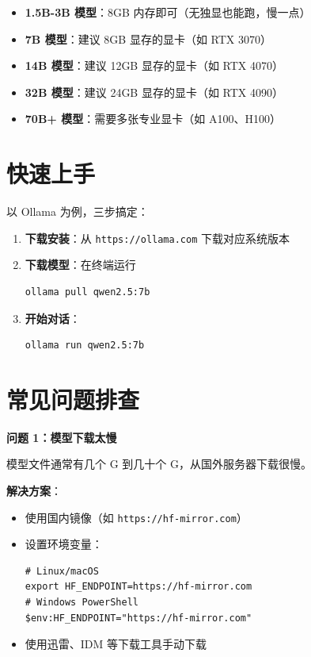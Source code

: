 \documentclass[12pt,UTF8]{ctexbook}
\begin{document}
\begin{itemize}
  \item \textbf{1.5B-3B 模型}：8GB 内存即可（无独显也能跑，慢一点）
  \item \textbf{7B 模型}：建议 8GB 显存的显卡（如 RTX 3070）
  \item \textbf{14B 模型}：建议 12GB 显存的显卡（如 RTX 4070）
  \item \textbf{32B 模型}：建议 24GB 显存的显卡（如 RTX 4090）
  \item \textbf{70B+ 模型}：需要多张专业显卡（如 A100、H100）
\end{itemize}

\section{快速上手}

以 Ollama 为例，三步搞定：

\begin{enumerate}
  \item \textbf{下载安装}：从 \texttt{https://ollama.com} 下载对应系统版本
  \item \textbf{下载模型}：在终端运行
\begin{verbatim}
ollama pull qwen2.5:7b
\end{verbatim}
  \item \textbf{开始对话}：
\begin{verbatim}
ollama run qwen2.5:7b
\end{verbatim}
\end{enumerate}

\section{常见问题排查}

\textbf{问题 1：模型下载太慢}

模型文件通常有几个 G 到几十个 G，从国外服务器下载很慢。

\textbf{解决方案}：
\begin{itemize}
  \item 使用国内镜像（如 \texttt{https://hf-mirror.com}）
  \item 设置环境变量：
\begin{verbatim}
# Linux/macOS
export HF_ENDPOINT=https://hf-mirror.com
# Windows PowerShell
$env:HF_ENDPOINT="https://hf-mirror.com"
\end{verbatim}
  \item 使用迅雷、IDM 等下载工具手动下载
\end{itemize}
\end{document}
